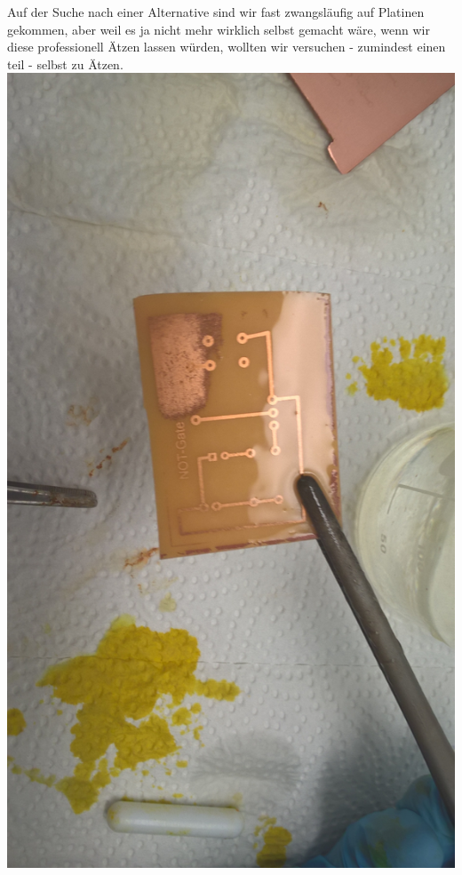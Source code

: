 \documentclass{scrartcl}
\begin{document}
    Auf der Suche nach einer Alternative sind wir fast zwangsläufig auf Platinen gekommen, aber weil es ja nicht mehr wirklich selbst gemacht wäre, wenn wir diese professionell Ätzen lassen würden,
    wollten wir versuchen - zumindest einen teil - selbst zu Ätzen.
    \includegraphics[width=\linewidth/2,angle=0]{Handy/WP_20210704_20_54_21_Pro}
\end{document}
